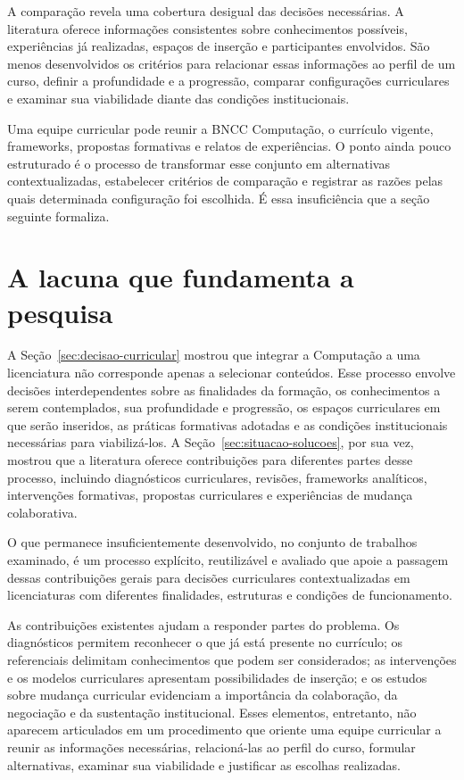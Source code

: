A comparação revela uma cobertura desigual das decisões necessárias. A literatura oferece informações consistentes sobre conhecimentos possíveis, experiências já realizadas, espaços de inserção e participantes envolvidos. São menos desenvolvidos os critérios para relacionar essas informações ao perfil de um curso, definir a profundidade e a progressão, comparar configurações curriculares e examinar sua viabilidade diante das condições institucionais.

Uma equipe curricular pode reunir a BNCC Computação, o currículo vigente, frameworks, propostas formativas e relatos de experiências. O ponto ainda pouco estruturado é o processo de transformar esse conjunto em alternativas contextualizadas, estabelecer critérios de comparação e registrar as razões pelas quais determinada configuração foi escolhida. É essa insuficiência que a seção seguinte formaliza.

\section{A lacuna que fundamenta a pesquisa}
\label{sec:lacuna}

A Seção~\ref{sec:decisao-curricular} mostrou que integrar a Computação a uma licenciatura não corresponde apenas a selecionar conteúdos. Esse processo envolve decisões interdependentes sobre as finalidades da formação, os conhecimentos a serem contemplados, sua profundidade e progressão, os espaços curriculares em que serão inseridos, as práticas formativas adotadas e as condições institucionais necessárias para viabilizá-los. A Seção~\ref{sec:situacao-solucoes}, por sua vez, mostrou que a literatura oferece contribuições para diferentes partes desse processo, incluindo diagnósticos curriculares, revisões, frameworks analíticos, intervenções formativas, propostas curriculares e experiências de mudança colaborativa.

O que permanece insuficientemente desenvolvido, no conjunto de trabalhos examinado, é um processo explícito, reutilizável e avaliado que apoie a passagem dessas contribuições gerais para decisões curriculares contextualizadas em licenciaturas com diferentes finalidades, estruturas e condições de funcionamento.

As contribuições existentes ajudam a responder partes do problema. Os diagnósticos permitem reconhecer o que já está presente no currículo; os referenciais delimitam conhecimentos que podem ser considerados; as intervenções e os modelos curriculares apresentam possibilidades de inserção; e os estudos sobre mudança curricular evidenciam a importância da colaboração, da negociação e da sustentação institucional. Esses elementos, entretanto, não aparecem articulados em um procedimento que oriente uma equipe curricular a reunir as informações necessárias, relacioná-las ao perfil do curso, formular alternativas, examinar sua viabilidade e justificar as escolhas realizadas.

